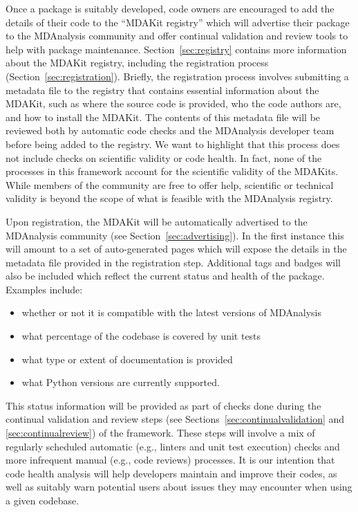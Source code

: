\documentclass[9pt,whitepaper]{livecoms}
\begin{document}
Once a package is suitably developed, code owners are encouraged to add the details of their code to the “MDAKit registry” which will advertise their package to the MDAnalysis community and offer continual validation and review tools to help with package maintenance. Section~\ref{sec:registry} contains more information about the MDAKit registry, including the registration process (Section~\ref{sec:registration}). Briefly, the registration process involves submitting a metadata file to the registry that contains essential information about the MDAKit, such as where the source code is provided, who the code authors are, and how to install the MDAKit. The contents of this metadata file will be reviewed both by automatic code checks and the MDAnalysis developer team before being  added to the registry. We want to highlight  that this process does not include checks on scientific validity or code health. In fact, none of the processes in this framework account for the scientific validity of the MDAKits. While members of the community are free to offer help, scientific or technical validity is beyond the scope of what is feasible with the MDAnalysis registry.

Upon registration, the MDAKit will be automatically advertised to the MDAnalysis community (see Section~\ref{sec:advertising}). In the first instance this will amount to a set of auto-generated pages which will expose the details in the metadata file provided in the registration step. Additional tags and badges will also be included which reflect the current status and health of the package. Examples include:
\begin{itemize}
    \item whether or not it is compatible with the latest versions of MDAnalysis
    \item what percentage of the codebase is covered by unit tests
    \item what type or extent of documentation is provided
    \item what Python versions are currently supported.
\end{itemize}

This status information will be provided as part of checks done during the continual validation and review steps (see Sections~\ref{sec:continualvalidation} and \ref{sec:continualreview}) of the framework. These steps will involve a mix of regularly scheduled automatic (e.g., linters and unit test execution) checks and more infrequent manual (e.g., code reviews) processes. It is our intention that code health analysis will help developers maintain and improve their codes, as well as suitably warn potential users about issues they may encounter when using a given codebase.
\end{document}
